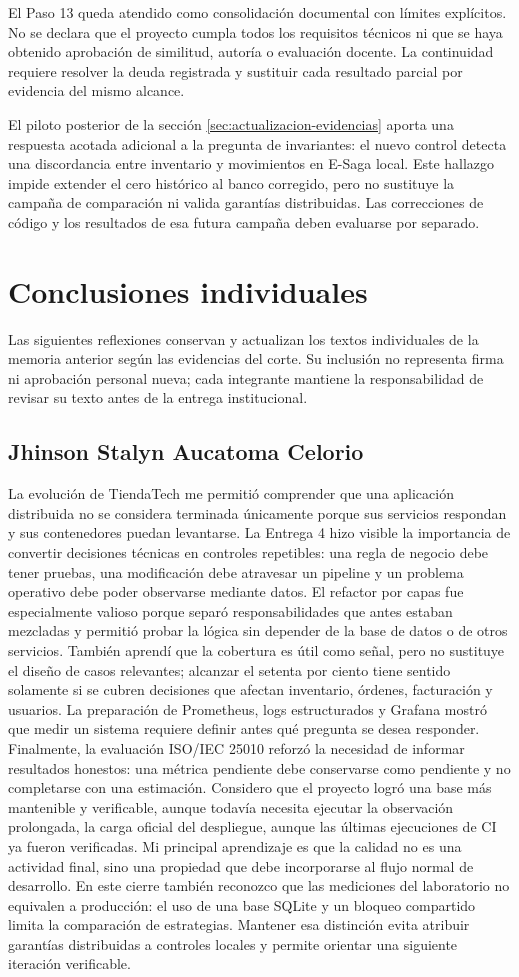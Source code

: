 \documentclass[12pt,a4paper]{article}
\newcommand{\seccion}[1]{\section{#1}}
\begin{document}
El Paso 13 queda atendido como consolidación documental con límites explícitos. No se declara que el proyecto cumpla todos los requisitos técnicos ni que se haya obtenido aprobación de similitud, autoría o evaluación docente. La continuidad requiere resolver la deuda registrada y sustituir cada resultado parcial por evidencia del mismo alcance.

El piloto posterior de la sección \ref{sec:actualizacion-evidencias} aporta una respuesta acotada adicional a la pregunta de invariantes: el nuevo control detecta una discordancia entre inventario y movimientos en E-Saga local. Este hallazgo impide extender el cero histórico al banco corregido, pero no sustituye la campaña de comparación ni valida garantías distribuidas. Las correcciones de código y los resultados de esa futura campaña deben evaluarse por separado.

\seccion{Conclusiones individuales}
Las siguientes reflexiones conservan y actualizan los textos individuales de la memoria anterior según las evidencias del corte. Su inclusión no representa firma ni aprobación personal nueva; cada integrante mantiene la responsabilidad de revisar su texto antes de la entrega institucional.

\subsection{Jhinson Stalyn Aucatoma Celorio}
La evolución de TiendaTech me permitió comprender que una aplicación distribuida no se considera terminada únicamente porque sus servicios respondan y sus contenedores puedan levantarse. La Entrega 4 hizo visible la importancia de convertir decisiones técnicas en controles repetibles: una regla de negocio debe tener pruebas, una modificación debe atravesar un pipeline y un problema operativo debe poder observarse mediante datos. El refactor por capas fue especialmente valioso porque separó responsabilidades que antes estaban mezcladas y permitió probar la lógica sin depender de la base de datos o de otros servicios. También aprendí que la cobertura es útil como señal, pero no sustituye el diseño de casos relevantes; alcanzar el setenta por ciento tiene sentido solamente si se cubren decisiones que afectan inventario, órdenes, facturación y usuarios. La preparación de Prometheus, logs estructurados y Grafana mostró que medir un sistema requiere definir antes qué pregunta se desea responder. Finalmente, la evaluación ISO/IEC 25010 reforzó la necesidad de informar resultados honestos: una métrica pendiente debe conservarse como pendiente y no completarse con una estimación. Considero que el proyecto logró una base más mantenible y verificable, aunque todavía necesita ejecutar la observación prolongada, la carga oficial del despliegue, aunque las últimas ejecuciones de CI ya fueron verificadas. Mi principal aprendizaje es que la calidad no es una actividad final, sino una propiedad que debe incorporarse al flujo normal de desarrollo. En este cierre también reconozco que las mediciones del laboratorio no equivalen a producción: el uso de una base SQLite y un bloqueo compartido limita la comparación de estrategias. Mantener esa distinción evita atribuir garantías distribuidas a controles locales y permite orientar una siguiente iteración verificable.
\end{document}

